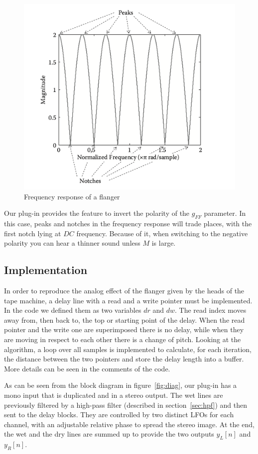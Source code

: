 \begin{figure}
	\centering
	\includegraphics[width=0.5\linewidth]{assets/comb.png}
	\caption{Frequency response of a flanger}
	\label{fig:comb}
\end{figure}

Our plug-in provides the feature to invert the polarity of the $g_{FF}$ parameter. In this case, peaks and notches in the frequency response will trade places, with the first notch lying at $DC$ frequency. Because of it, when switching to the negative polarity you can hear a thinner sound unless $M$ is large.

\subsection{Implementation}\label{sec:implementation}

In order to reproduce the analog effect of the flanger given by the heads of the tape machine, a delay line with a read and a write pointer must be implemented. In the code we defined them as two variables $dr$ and $dw$. The read index moves away from, then back to, the top or starting point of the delay. When the read pointer and the write one are superimposed there is no delay, while when they are moving in respect to each other there is a change of pitch. Looking at the algorithm, a loop over all samples is implemented to calculate, for each iteration, the distance between the two pointers and store the delay length into a buffer. More details can be seen in the comments of the code.

As can be seen from the block diagram in figure~\ref{fig:diag}, our plug-in has a mono input that is duplicated and in a stereo output.
The wet lines are previously filtered by a high-pass filter (described in section~\ref{sec:hpf}) and then sent to the delay blocks. They are controlled by two distinct LFOs for each channel, with an adjustable relative phase to spread the stereo image. At the end, the wet and the dry lines are summed up to provide the two outputs $y_L[n]$ and $y_R[n]$. 

